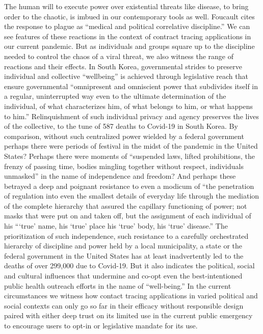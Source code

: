 \documentclass[11pt,dvipdfm]{article}
\begin{document}
The human will to execute power over existential threats like disease, to bring order to the chaotic, is imbued in our contemporary tools as well. Foucault cites the response to plague as “medical and political correlative discipline.”  We can see features of these reactions in the context of contract tracing applications in our current pandemic.  But as individuals and groups square up to the discipline needed to control the chaos of a viral threat, we also witness the range of reactions and their effects.  In South Korea, governmental strides to preserve individual and collective “wellbeing” is achieved through legislative reach that ensure governmental “omnipresent and omniscient power that subdivides itself in a regular, uninterrupted way even to the ultimate determination of the individual, of what characterizes him, of what belongs to him, or what happens to him.”   Relinquishment of such individual privacy and agency preserves the lives of the collective, to the tune of 587 deaths to Covid-19 in South Korea.    By comparison, without such centralized power wielded by a federal government perhaps there were periods of festival in the midst of the pandemic in the United States?  Perhaps there were moments of “suspended laws, lifted prohibitions, the frenzy of passing time, bodies mingling together without respect, individuals unmasked” in the name of independence and freedom?  And perhaps these betrayed a deep and poignant resistance to even a modicum of “the penetration of regulation into even the smallest details of everyday life through the mediation of the complete hierarchy that assured the capillary functioning of power; not masks that were put on and taken off, but the assignment of each individual of his “‘true’ name, his ‘true’ place his ‘true’ body, his ‘true’ disease.”  The prioritization of such independence, such resistance to a carefully orchestrated hierarchy of discipline and power held by a local municipality, a state or the federal government in the United States has at least inadvertently led to the deaths of over 299,000 due to Covid-19.  But it also indicates the political, social and cultural influences that undermine and co-opt even the best-intentioned public health outreach efforts in the name of “well-being.”  In the current circumstances we witness how contact tracing applications in varied political and social contexts can only go so far in their efficacy without responsible design paired with either deep trust on its limited use in the current public emergency to encourage users to opt-in or legislative mandate for its use.  
\end{document}
